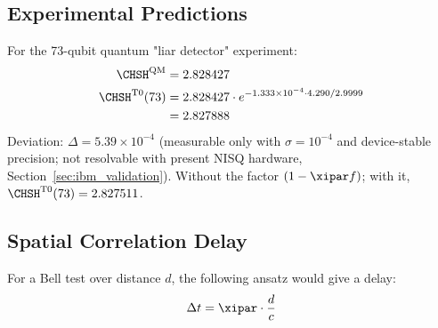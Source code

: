 \subsection{Experimental Predictions}
\label{sec:experiments}
\begin{experimentbox}
	For the 73-qubit quantum "liar detector" experiment:
	\begin{align}
		\CHSH^{\text{QM}} &= 2.828427 \\
		\CHSH^{\text{T0}}(73) &= 2.828427 \cdot e^{-1.333 \times 10^{-4} \cdot 4.290/2.9999} \\
		&= 2.827888
	\end{align}
	Deviation: $\Delta = 5.39 \times 10^{-4}$ (measurable only with $\sigma = 10^{-4}$ and device-stable precision; not resolvable with present NISQ hardware, Section~\ref{sec:ibm_validation}). Without the factor $(1 - \xipar f)$; with it, $\CHSH^{\text{T0}}(73) = 2.827511$.
\end{experimentbox}

\begin{table}[h]
	\centering
	\caption{T0 CHSH predictions for multi-qubit systems (column ``Testable'': with error-corrected hardware; none of the values is resolvable with present NISQ hardware)}
	\label{tab:chsh_predictions}
\end{table}

\subsection{Spatial Correlation Delay}
\label{sec:spatial_delay}

\begin{proposition}
	For a Bell test over distance $d$, the following ansatz would give a delay:
	\begin{equation}
		\Delta t = \xipar \cdot \frac{d}{c}
		\label{eq:spatial_delay}
	\end{equation}
\end{proposition}

